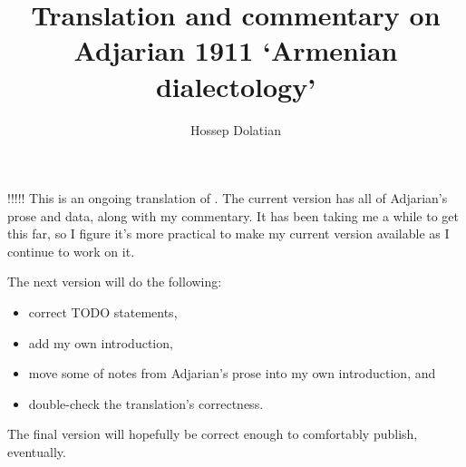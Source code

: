 \documentclass{book}
\title{Translation and commentary  on Adjarian 1911 `Armenian dialectology'}	%
\author{Hossep Dolatian}		%
\begin{document}
 


!!!!! This is an ongoing translation of \citet{Adjarian-1911-DialectologyBook}. The current version has all of Adjarian's prose and data, along with my commentary. It has been taking me a while to get this far, so I figure it's more practical to make my current version available as I continue to work on it.

The next version will do the following:
\begin{itemize}
	\item 
	correct  TODO statements,
	\item  add my own introduction, 
	\item move some of notes from Adjarian's prose into my own introduction, and
	\item  double-check the translation's correctness.
\end{itemize} 

The final version  will hopefully be correct enough to comfortably publish, eventually. 

\maketitle
\tableofcontents



 
% 
   

 
\newcommand{\doi}[1]{\href{http://dx.doi.org/#1}{http://dx.doi.org/#1}}	%
\end{document}

